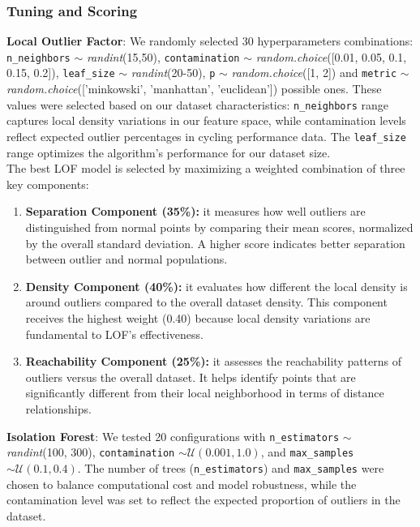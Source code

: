 \documentclass[a4paper, twoside]{article}
\begin{document}
\subsubsection{Tuning and Scoring}
\textbf{Local Outlier Factor}: We randomly selected 30 hyperparameters combinations: \texttt{n\_neighbors} $\sim$ \textit{randint}(15,50), \texttt{contamination} $\sim$ \textit{random.choice}([0.01, 0.05, 0.1, 0.15, 0.2]), \texttt{leaf\_size} $\sim$ \textit{randint}(20-50), \texttt{p} $\sim$ \textit{random.choice}([1, 2]) and \texttt{metric} $\sim$ \textit{random.choice}(['minkowski', 'manhattan', 'euclidean']) possible ones. These values were selected based on our dataset characteristics: \texttt{n\_neighbors} range captures local density variations in our feature space, while contamination levels reflect expected outlier percentages in cycling performance data. The \texttt{leaf\_size} range optimizes the algorithm's performance for our dataset size.
\\
The best LOF model is selected by maximizing a weighted combination of three key components:
\begin{enumerate}[noitemsep]
    \item \textbf{Separation Component (35\%):} it measures how well outliers are distinguished from normal points by comparing their mean scores, normalized by the overall standard deviation. A higher score indicates better separation between outlier and normal populations.
    
    \item \textbf{Density Component (40\%):} it evaluates how different the local density is around outliers compared to the overall dataset density. This component receives the highest weight (0.40) because local density variations are fundamental to LOF's effectiveness.
    
    \item \textbf{Reachability Component (25\%):} it assesses the reachability patterns of outliers versus the overall dataset. It helps identify points that are significantly different from their local neighborhood in terms of distance relationships.
\end{enumerate}
\textbf{Isolation Forest}: We tested 20 configurations with \texttt{n\_estimators} $ \sim $ \textit{randint}(100, 300), \texttt{contamination} $ \sim \mathcal{U}(0.001, 1.0)$, and \texttt{max\_samples} $\sim \mathcal{U}(0.1,0.4)$. The number of trees (\texttt{n\_estimators}) and \texttt{max\_samples} were chosen to balance computational cost and model robustness, while the contamination level was set to reflect the expected proportion of outliers in the dataset.
\end{document}
